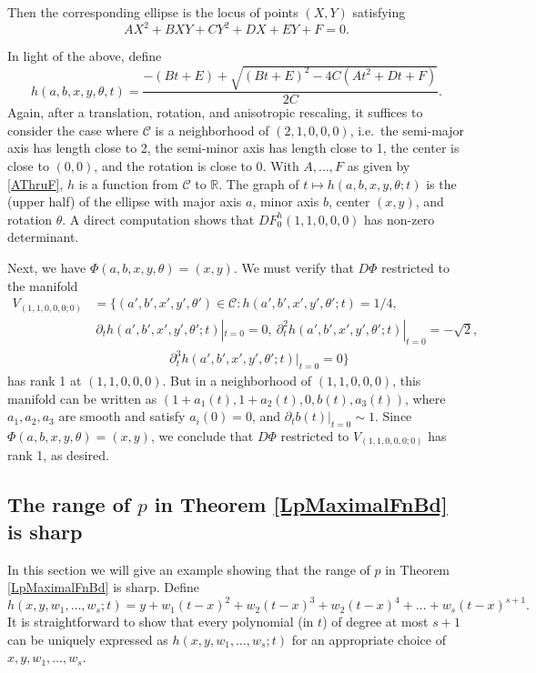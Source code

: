 \documentclass[letterpaper, reqno,11pt]{article}
\numberwithin{equation}{section}
\newcommand{\RR}{\mathbb{R}}
\numberwithin{thm}{section}
\theoremstyle{remark}
\begin{document}
Then the corresponding ellipse is the locus of points $(X,Y)$ satisfying
\[
AX^2+BXY+CY^2+DX+EY+F=0.
\]

In light of the above, define
\[
h(a,b,x,y,\theta,t) = \frac{-(Bt+E) + \sqrt{(Bt+E)^2 - 4C(At^2+Dt+F)}}{2C}.
\]
Again, after a translation, rotation, and anisotropic rescaling, it suffices to consider the case where $\mathcal{C}$ is a neighborhood of $(2,1,0,0,0)$, i.e.~the semi-major axis has length close to 2, the semi-minor axis has length close to 1, the center is close to $(0,0)$, and the rotation is close to 0. With $A,\ldots,F$ as given by \eqref{AThruF}, $h$ is a function from $\mathcal{C}$ to $\RR$. The graph of $t\mapsto h(a,b,x,y,\theta;t)$ is the (upper half) of the ellipse with major axis $a$, minor axis $b$, center $(x,y)$, and rotation $\theta$. A direct computation shows that $DF^h_0(1,1,0,0,0)$ has non-zero determinant. 


Next, we have $\Phi(a,b,x,y,\theta) = (x,y)$. We must verify that $D\Phi$ restricted to the manifold
\begin{equation*}
\begin{split}
V_{(1,1,0,0,0;0)} & = \{(a', b', x',y',\theta')\in \mathcal{C}\colon h(a', b', x',y',\theta';t) = 1/4,\\
& \ \partial_t h(a', b', x',y',\theta';t)|_{t=0} = 0,\ \partial^2_t h(a', b', x',y',\theta';t)|_{t=0}=-\sqrt 2,\\
& \qquad\qquad\qquad \partial^3_t h(a', b', x',y',\theta';t)|_{t=0}=0\}
\end{split}
\end{equation*}
has rank 1 at $(1,1,0,0,0).$ But in a neighborhood of $(1,1,0,0,0)$, this manifold can be written as $(1+a_1(t), 1+a_2(t), 0, b(t), a_3(t))$, where $a_1,a_2,a_3$ are smooth and satisfy $a_i(0)=0$, and $\partial_t b(t)|_{t=0}\sim 1$. Since $\Phi(a,b,x,y,\theta)=(x,y)$, we conclude that  $D\Phi$ restricted to $V_{(1,1,0,0,0;0)} $ has rank 1, as desired. 



\subsection{The range of $p$ in Theorem \ref{LpMaximalFnBd} is sharp}\label{rangeOfPIsSharp}
In this section we will give an example showing that the range of $p$ in Theorem \ref{LpMaximalFnBd} is sharp. Define 
\[
h(x,y,w_1,\ldots,w_s;t)= y + w_1(t-x)^2 + w_2(t-x)^3 + w_2(t-x)^4 + \ldots + w_s(t-x)^{s+1}.
\] 
It is straightforward to show that every polynomial (in $t$) of degree at most $s+1$ can be uniquely expressed as $h(x,y,w_1,\ldots,w_s;t)$ for an appropriate choice of $x,y,w_1,\ldots,w_s$. 
\end{document}
